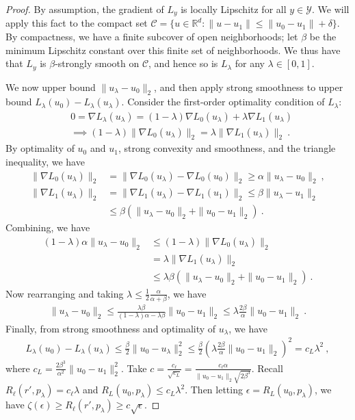 \documentclass[12pt]{article}
\newcommand{\reals}{\mathbb{R}}
\newcommand{\Y}{\mathcal{Y}}
\begin{document}
\begin{proof}
  By assumption, the gradient of $L_y$ is locally Lipschitz for all $y\in\Y$.
  We will apply this fact to the compact set $\mathcal C = \{u \in \reals^d : \|u - u_1\| \leq \|u_0 - u_1\| + \delta\}$.
  By compactness, we have a finite subcover of open neighborhoods; let $\beta$ be the minimum Lipschitz constant over this finite set of neighborhoods.
  We thus have that $L_y$ is $\beta$-strongly smooth on $\mathcal C$, and hence so is $L_\lambda$ for any $\lambda \in [0,1]$.
  
  We now upper bound $\|u_\lambda - u_0\|_2$, and then apply strong smoothness to upper bound $L_\lambda(u_0) - L_\lambda(u_\lambda)$.
  Consider the first-order optimality condition of $L_\lambda$:
  \begin{align*}
    \label{eq:first-order-opt-smooth}
    & 0 = \nabla L_\lambda(u_\lambda) = (1-\lambda) \nabla L_0(u_\lambda) + \lambda \nabla L_1(u_\lambda)
    \\
    & \implies (1-\lambda) \|\nabla L_0(u_\lambda)\|_2 = \lambda \|\nabla L_1(u_\lambda)\|_2~.
  \end{align*}
  By optimality of $u_0$ and $u_1$, strong convexity and smoothness, and the triangle inequality, we have
  \begin{align*}
    \|\nabla L_0(u_\lambda)\|_2 &= \|\nabla L_0(u_\lambda) - \nabla L_0(u_0)\|_2 \geq \alpha \|u_\lambda - u_0\|_2~,
    \\
    \|\nabla L_1(u_\lambda)\|_2 &= \|\nabla L_1(u_\lambda) - \nabla L_1(u_1)\|_2 \leq \beta \|u_\lambda - u_1\|_2
    \\
    &\leq \beta \left( \|u_\lambda - u_0\|_2 + \|u_0 - u_1\|_2 \right)~.
  \end{align*}
  Combining, we have
  \begin{align*}
    (1-\lambda) \alpha \|u_\lambda - u_0\|_2
    &\leq
      (1-\lambda) \|\nabla L_0(u_\lambda)\|_2
    \\
    &= \lambda \|\nabla L_1(u_\lambda)\|_2
    \\
    &\leq
      \lambda \beta \left( \|u_\lambda - u_0\|_2 + \|u_0 - u_1\|_2 \right)~.
  \end{align*}
  Now rearranging and taking $\lambda \leq \tfrac 1 2 \tfrac {\alpha}{\alpha+\beta}$, we have
  \begin{align*}
    \|u_\lambda - u_0\|_2 \leq \frac{\lambda\beta}{(1-\lambda)\alpha-\lambda\beta} \|u_0 - u_1\|_2  \leq \lambda \frac{2\beta}{\alpha} \|u_0 - u_1\|_2 ~.
  \end{align*}
  Finally, from strong smoothness and optimality of $u_\lambda$, we have
  \begin{align*}
    L_\lambda(u_0) - L_\lambda(u_\lambda) \leq \frac{\beta}{2} \|u_0 - u_\lambda\|_2^2 \leq \frac{\beta}{2} \left(\lambda \frac{2\beta}{\alpha} \|u_0 - u_1\|_2\right)^2 = c_L \lambda^2~,
  \end{align*}
  where $c_L = \frac{2\beta^3}{\alpha^2} \|u_0 - u_1\|_2^2$.
  Take $c = \frac{c_\ell}{\sqrt{c_L}} = \frac{c_\ell \alpha}{\|u_0 - u_1\|_2 \sqrt{2\beta^3}}$.
  Recall $R_\ell(r',p_\lambda) = c_\ell \lambda$ and $R_L(u_0,p_\lambda) \leq c_L \lambda^2$.
  Then letting $\epsilon = R_L(u_0,p_\lambda)$, we have $\zeta(\epsilon) \geq R_\ell(r',p_\lambda) \geq c \sqrt{\epsilon}$.
\end{proof}
\end{document}
